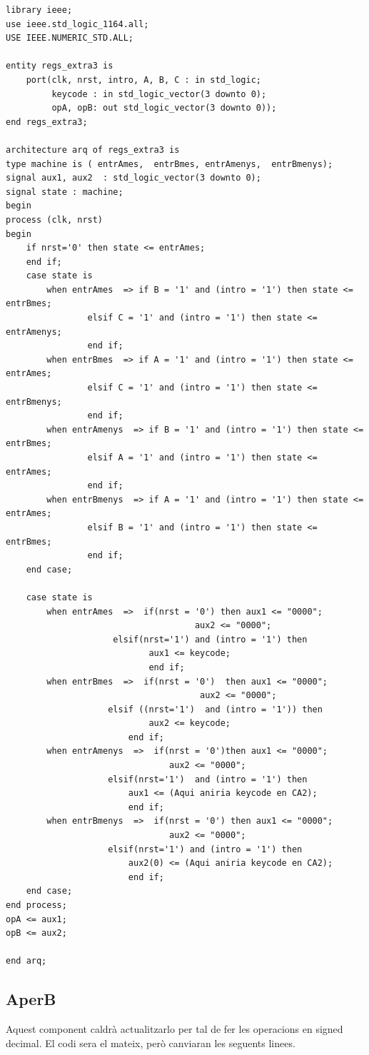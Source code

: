 \documentclass[12pt, a4papre]{article}
\begin{document}
\begin{lstlisting}[style=vhdl, frame=single, basicstyle=\tiny]
library ieee;
use ieee.std_logic_1164.all;
USE IEEE.NUMERIC_STD.ALL;

entity regs_extra3 is
	port(clk, nrst, intro, A, B, C : in std_logic;
		 keycode : in std_logic_vector(3 downto 0);
		 opA, opB: out std_logic_vector(3 downto 0));
end regs_extra3;

architecture arq of regs_extra3 is
type machine is ( entrAmes,  entrBmes, entrAmenys,  entrBmenys);
signal aux1, aux2  : std_logic_vector(3 downto 0);
signal state : machine;
begin
process (clk, nrst)
begin 
	if nrst='0' then state <= entrAmes;
	end if;
	case state is
		when entrAmes  => if B = '1' and (intro = '1') then state <= entrBmes; 
				elsif C = '1' and (intro = '1') then state <= entrAmenys; 
				end if;			  
		when entrBmes  => if A = '1' and (intro = '1') then state <= entrAmes; 
				elsif C = '1' and (intro = '1') then state <= entrBmenys; 
				end if;
		when entrAmenys  => if B = '1' and (intro = '1') then state <= entrBmes; 
				elsif A = '1' and (intro = '1') then state <= entrAmes; 
				end if;	
		when entrBmenys  => if A = '1' and (intro = '1') then state <= entrAmes; 
				elsif B = '1' and (intro = '1') then state <= entrBmes;
				end if;		
	end case;
	
	case state is
		when entrAmes  =>  if(nrst = '0') then aux1 <= "0000"; 
									 aux2 <= "0000";
					 elsif(nrst='1') and (intro = '1') then
							aux1 <= keycode;
							end if;
		when entrBmes  =>  if(nrst = '0')  then aux1 <= "0000"; 
									  aux2 <= "0000";
					elsif ((nrst='1')  and (intro = '1')) then
							aux2 <= keycode;
						end if;
		when entrAmenys  =>  if(nrst = '0')then aux1 <= "0000"; 
								aux2 <= "0000";
					elsif(nrst='1')  and (intro = '1') then
						aux1 <= (Aqui aniria keycode en CA2);
						end if;
		when entrBmenys  =>  if(nrst = '0') then aux1 <= "0000"; 
								aux2 <= "0000";
					elsif(nrst='1') and (intro = '1') then
						aux2(0) <= (Aqui aniria keycode en CA2);
						end if;
	end case;
end process;
opA <= aux1;
opB <= aux2;

end arq;
\end{lstlisting}

\subsection{AperB}

Aquest component caldrà actualitzarlo per tal de fer les operacions en signed decimal. El codi sera el mateix, però canviaran les seguents linees.
\end{document}
